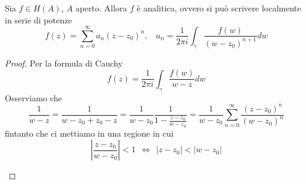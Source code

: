 \begin{thm}
[di Weierstrass]
Sia $f\in H(A)$, $A$ aperto. Allora $f$ è analitica, ovvero si può scrivere localmente in serie di potenze
\begin{equation*}
f(z) = \sum^{\infty}_{n = 0} a_{n}(z - z_{0})^{n}, \ \ \ \ a_{n} = \frac{1}{2\pi i}\int_{\gamma}\frac{f(w)}{(w - z_{0})^{n + 1}} dw
\end{equation*}
\end{thm}

\begin{proof}

Per la formula di Cauchy
\begin{equation*}
f(z) = \frac{1}{2\pi i}\int_{\gamma}\frac{f(w)}{w - z} dw
\end{equation*}
Osserviamo che
\begin{equation*}
\frac{1}{w - z} = \frac{1}{w - z_{0} + z_{0} - z} = \frac{1}{w - z_{0}}\frac{1}{1 - \frac{z - z_{0}}{w - z_{0}}} = \frac{1}{w - z_{0}}\sum^{\infty}_{n = 0}\frac{(z - z_{0})^{n}}{(w - z_{0})^{n}}
\end{equation*}
fintanto che ci mettiamo in una regione in cui
\begin{equation*}
\left| \frac{z - z_{0}}{w - z_{0}}\right| < 1\ \ \iff \ \ | z - z_{0}| < | w - z_{0}|
\end{equation*}

\begin{figure}[htpb]
\centering
{} %

\begin{tikzpicture}[x = 0.75pt, y = 0.75pt, yscale = - 1, xscale = 1]


\end{tikzpicture}
\end{figure}
\end{proof}
